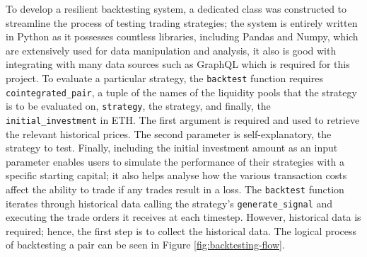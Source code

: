To develop a resilient backtesting system, a dedicated class was constructed to streamline the process of testing trading strategies; the system is entirely written in Python as it possesses countless libraries, including Pandas and Numpy, which are extensively used for data manipulation and analysis, it also is good with integrating with many data sources such as GraphQL which is required for this project. To evaluate a particular strategy, the \texttt{backtest} function requires \texttt{cointegrated\_pair}, a tuple of the names of the liquidity pools that the strategy is to be evaluated on, \texttt{strategy}, the strategy, and finally, the \texttt{initial\_investment} in ETH. The first argument is required and used to retrieve the relevant historical prices. The second parameter is self-explanatory, the strategy to test. Finally, including the initial investment amount as an input parameter enables users to simulate the performance of their strategies with a specific starting capital; it also helps analyse how the various transaction costs affect the ability to trade if any trades result in a loss. The \texttt{backtest} function iterates through historical data calling the strategy's \texttt{generate\_signal} and executing the trade orders it receives at each timestep. However, historical data is required; hence, the first step is to collect the historical data. The logical process of backtesting a pair can be seen in Figure \ref{fig:backtesting-flow}.
